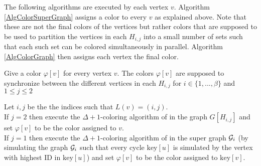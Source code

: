 \documentclass{article}
\theoremstyle{definition}
\begin{document}
The following algorithms are executed by each vertex $v$.
Algorithm \ref{AlgColorSuperGraph} assigns a color to every $v$ as explained above.
Note that these are not the final colors of the vertices but rather colors that are supposed to be used
to partition the vertices in each $H_{i,j}$ into a small number of sets such that each such set can be colored simultaneously in parallel.
Algorithm \ref{AlgColorGraph} then assigns each vertex the final color.  \medskip \smallskip

\begin{algorithm}[H]\label{AlgColorSuperGraph}\small
	\caption{Give a color $\varphi[v]$ for every vertex $v$. The colors $\varphi[v]$ are supposed to synchronize between the different vertices in each $H_{i,j}$ for $i \in \{1, ..., \beta\}$ and $1 \leq j \leq 2$}
\SetInd{1em}{0em}
Let $i,j$ be the the indices such that $L(v) = (i,j)$.\\
If $j=2$ then execute the $\Delta+1$-coloring algorithm of \cite{Goldberg87} in the graph $G[H_{i,j}]$ and set $\varphi[v]$ to be the color assigned to $v$.\\
If $j=1$  then execute the $\Delta+1$-coloring algorithm of \cite{Goldberg87} in the super graph ${\cal G}_i$ (by simulating the graph ${\cal G}_i$ such that every cycle $\text{key}[u]$ is simulated by the vertex with highest ID in $\text{key}[u]$) and set $\varphi[v]$ to be the color assigned to $\text{key}[v]$.
%
%
%
%
%
%
%
%
%
%
%


\end{algorithm}
\end{document}
